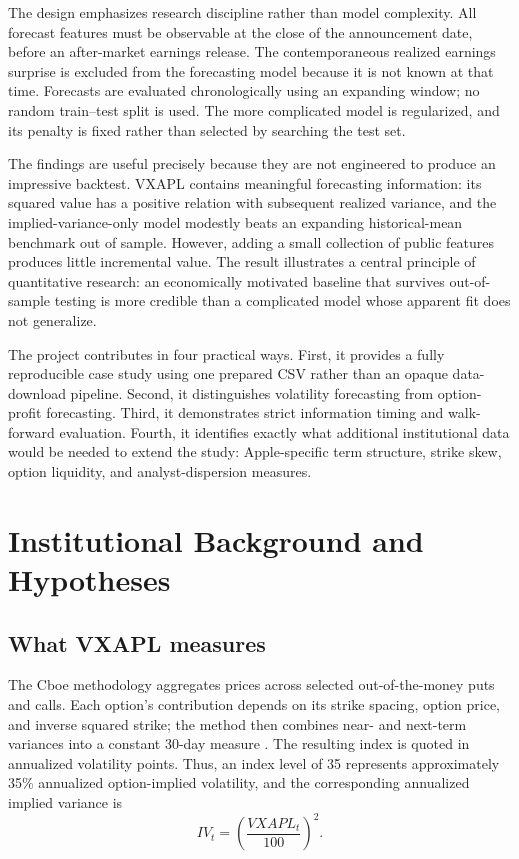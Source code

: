 \documentclass[11pt]{article}
\begin{document}
The design emphasizes research discipline rather than model complexity. All forecast features must be observable at the close of the announcement date, before an after-market earnings release. The contemporaneous realized earnings surprise is excluded from the forecasting model because it is not known at that time. Forecasts are evaluated chronologically using an expanding window; no random train--test split is used. The more complicated model is regularized, and its penalty is fixed rather than selected by searching the test set.

The findings are useful precisely because they are not engineered to produce an impressive backtest. VXAPL contains meaningful forecasting information: its squared value has a positive relation with subsequent realized variance, and the implied-variance-only model modestly beats an expanding historical-mean benchmark out of sample. However, adding a small collection of public features produces little incremental value. The result illustrates a central principle of quantitative research: an economically motivated baseline that survives out-of-sample testing is more credible than a complicated model whose apparent fit does not generalize.

The project contributes in four practical ways. First, it provides a fully reproducible case study using one prepared CSV rather than an opaque data-download pipeline. Second, it distinguishes volatility forecasting from option-profit forecasting. Third, it demonstrates strict information timing and walk-forward evaluation. Fourth, it identifies exactly what additional institutional data would be needed to extend the study: Apple-specific term structure, strike skew, option liquidity, and analyst-dispersion measures.

\section{Institutional Background and Hypotheses}

\subsection{What VXAPL measures}

The Cboe methodology aggregates prices across selected out-of-the-money puts and calls. Each option's contribution depends on its strike spacing, option price, and inverse squared strike; the method then combines near- and next-term variances into a constant 30-day measure \citep{cboe2025methodology}. The resulting index is quoted in annualized volatility points. Thus, an index level of 35 represents approximately 35\% annualized option-implied volatility, and the corresponding annualized implied variance is
\begin{equation}
IV_t = \left(\frac{VXAPL_t}{100}\right)^2.
\end{equation}
\end{document}
